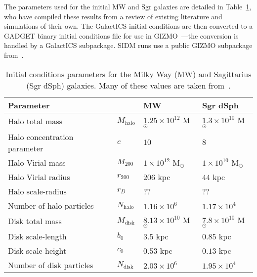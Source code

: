 The parameters used for the initial MW and Sgr galaxies are detailed in
Table~\ref{tab:params}, who have compiled these results from a review of
existing literature and simulations of their own.
The GalactICS initial conditions are then converted to a GADGET binary initial
conditions file for use in
GIZMO~\cite{hopkins_gizmo_2015,springel_cosmological_2005}---the conversion is
handled by a GalactICS subpackage. SIDM runs use a public GIZMO subpackage
from~\cite{robles_sidm_2017}.

\begin{table}
    \centering
    \begin{tabular}{llll}
        \hline\hline
        Parameter                       & & MW & Sgr dSph \\ 
        \hline
        Halo total mass                 & $M_{\text{halo}}$
                                        & $1.25 \times 10^{12}$ M$_\odot$ 
                                        & $1.3 \times 10^{10}$ M$_\odot$ \\
        Halo concentration parameter    & $c$
                                        & $10$ 
                                        & $8$ \\
        Halo Virial mass                & $M_{200}$
                                        & $1 \times 10^{12}$ M$_\odot$
                                        & $1 \times 10^{10}$ M$_\odot$ \\
        Halo Virial radius              & $r_{200}$
                                        & $206$ kpc 
                                        & $44$ kpc \\
        Halo scale-radius               & $r_D$
                                        & ?? 
                                        & ?? \\
        Number of halo particles        & $N_{\text{halo}}$
                                        & $1.16 \times 10^6$ 
                                        & $1.17 \times 10^4$ \\
        \hline
        Disk total mass                 & $M_{\text{disk}}$
                                        & $8.13 \times 10^{10}$ M$_\odot$ 
                                        & $7.8 \times 10^{10}$ M$_\odot$ \\
        Disk scale-length               & $b_0$
                                        & $3.5$ kpc 
                                        & $0.85$ kpc \\
        Disk scale-height               & $c_0$
                                        & $0.53$ kpc 
                                        & $0.13$ kpc \\
        Number of disk particles        & $N_{\text{disk}}$
                                        & $2.03 \times 10^6$
                                        & $1.95 \times 10^4$ \\ 
        \hline\hline
    \end{tabular}
    \caption{Initial conditions parameters for the Milky Way (MW) and
    Sagittarius (Sgr dSph) galaxies. Many of these values are taken from~\cite{dierickx_predicted_2017}.}
    \label{tab:params}
\end{table}

